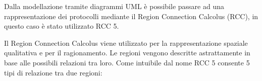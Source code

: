 \bigskip

Dalla modellazione tramite diagrammi UML è possibile passare ad una rappresentazione dei protocolli mediante il Region Connection Calcolus (RCC), in questo caso è stato utilizzato RCC 5.

Il Region Connection Calcolus viene utilizzato per la rappresentazione spaziale qualitativa e per il ragionamento. Le regioni vengono descritte astrattamente in base alle possibili relazioni tra loro.
Come intuibile dal nome RCC 5 consente 5 tipi di relazione tra due regioni:

\begin{figure}[h!] 
    \begin{minipage}{.5\linewidth}
    \centering 
    \end{minipage}%
    \begin{minipage}{.5\linewidth}
    \centering
    \end{minipage}%
    \\
    \begin{minipage}{.5\linewidth}
        \centering 
        \end{minipage}%
        \begin{minipage}{.5\linewidth}
        \centering
\end{minipage}
\end{figure}
